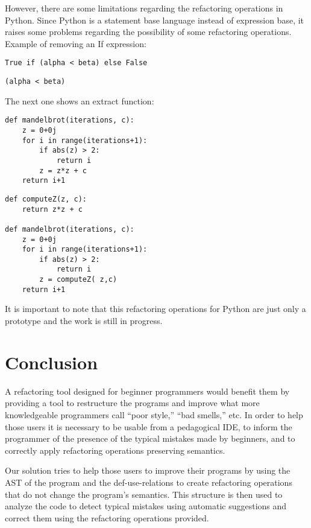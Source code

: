 However, there are some limitations regarding the refactoring operations in Python.
Since Python is a statement base language instead of expression base, it raises
some problems regarding the possibility of some refactoring operations. \\

Example of removing an If expression:
\lstset{style=python}
\begin{lstlisting}
True if (alpha < beta) else False
\end{lstlisting}


\begin{lstlisting}
(alpha < beta)
\end{lstlisting}

\vspace{50mm}
The next one shows an extract function:
\begin{lstlisting}
def mandelbrot(iterations, c):
    z = 0+0j
    for i in range(iterations+1):
        if abs(z) > 2:
            return i
        z = z*z + c
    return i+1
\end{lstlisting}
\begin{lstlisting}
def computeZ(z, c):
    return z*z + c

def mandelbrot(iterations, c):
    z = 0+0j
    for i in range(iterations+1):
        if abs(z) > 2:
            return i
        z = computeZ( z,c)
    return i+1
\end{lstlisting}
It is important to note that this refactoring operations for Python are just only a prototype and
the work is still in progress.
\section{Conclusion}
A refactoring tool designed for beginner programmers would benefit them
by providing a tool to restructure the programs and improve what more knowledgeable programmers call ``poor style,''
``bad smells,'' etc.
In order to help those users it is necessary to be usable from a pedagogical IDE,
to inform the programmer of the presence of the typical mistakes made by beginners, and
to correctly apply refactoring operations preserving semantics.

Our solution tries to help those users to improve their programs by using the AST of
the program and the def-use-relations to create refactoring operations that do not
change the program's semantics. This structure is then used to analyze the code
to detect typical mistakes using automatic suggestions and correct them using the
refactoring operations provided.


